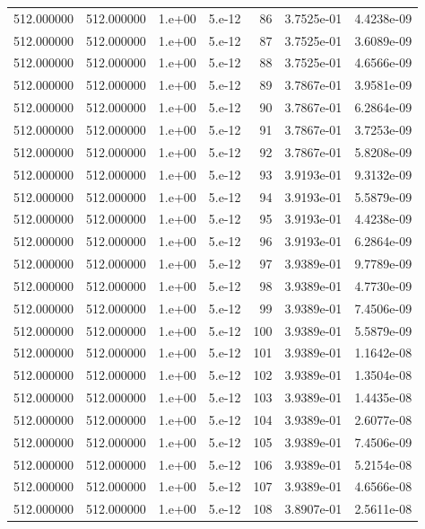 \begin{table}[htbp]
\begin{tabular}{rrrrrrr}
512.000000 & 512.000000 & 1.e+00 & 5.e-12 & 86 & 3.7525e-01 & 4.4238e-09 \\
512.000000 & 512.000000 & 1.e+00 & 5.e-12 & 87 & 3.7525e-01 & 3.6089e-09 \\
512.000000 & 512.000000 & 1.e+00 & 5.e-12 & 88 & 3.7525e-01 & 4.6566e-09 \\
512.000000 & 512.000000 & 1.e+00 & 5.e-12 & 89 & 3.7867e-01 & 3.9581e-09 \\
512.000000 & 512.000000 & 1.e+00 & 5.e-12 & 90 & 3.7867e-01 & 6.2864e-09 \\
512.000000 & 512.000000 & 1.e+00 & 5.e-12 & 91 & 3.7867e-01 & 3.7253e-09 \\
512.000000 & 512.000000 & 1.e+00 & 5.e-12 & 92 & 3.7867e-01 & 5.8208e-09 \\
512.000000 & 512.000000 & 1.e+00 & 5.e-12 & 93 & 3.9193e-01 & 9.3132e-09 \\
512.000000 & 512.000000 & 1.e+00 & 5.e-12 & 94 & 3.9193e-01 & 5.5879e-09 \\
512.000000 & 512.000000 & 1.e+00 & 5.e-12 & 95 & 3.9193e-01 & 4.4238e-09 \\
512.000000 & 512.000000 & 1.e+00 & 5.e-12 & 96 & 3.9193e-01 & 6.2864e-09 \\
512.000000 & 512.000000 & 1.e+00 & 5.e-12 & 97 & 3.9389e-01 & 9.7789e-09 \\
512.000000 & 512.000000 & 1.e+00 & 5.e-12 & 98 & 3.9389e-01 & 4.7730e-09 \\
512.000000 & 512.000000 & 1.e+00 & 5.e-12 & 99 & 3.9389e-01 & 7.4506e-09 \\
512.000000 & 512.000000 & 1.e+00 & 5.e-12 & 100 & 3.9389e-01 & 5.5879e-09 \\
512.000000 & 512.000000 & 1.e+00 & 5.e-12 & 101 & 3.9389e-01 & 1.1642e-08 \\
512.000000 & 512.000000 & 1.e+00 & 5.e-12 & 102 & 3.9389e-01 & 1.3504e-08 \\
512.000000 & 512.000000 & 1.e+00 & 5.e-12 & 103 & 3.9389e-01 & 1.4435e-08 \\
512.000000 & 512.000000 & 1.e+00 & 5.e-12 & 104 & 3.9389e-01 & 2.6077e-08 \\
512.000000 & 512.000000 & 1.e+00 & 5.e-12 & 105 & 3.9389e-01 & 7.4506e-09 \\
512.000000 & 512.000000 & 1.e+00 & 5.e-12 & 106 & 3.9389e-01 & 5.2154e-08 \\
512.000000 & 512.000000 & 1.e+00 & 5.e-12 & 107 & 3.9389e-01 & 4.6566e-08 \\
512.000000 & 512.000000 & 1.e+00 & 5.e-12 & 108 & 3.8907e-01 & 2.5611e-08 \\

\end{tabular}
\end{table}
